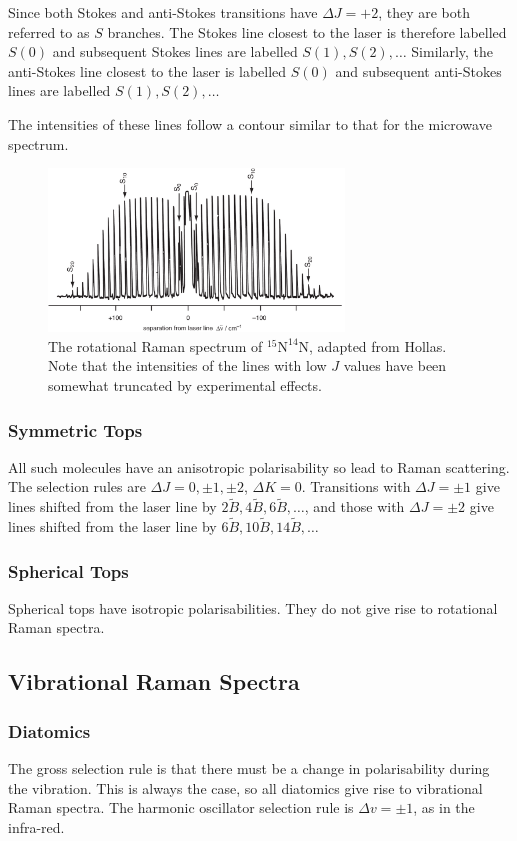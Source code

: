 \documentclass{article}
\theoremstyle{plain}\theoremheaderfont{\normalfont\itshape}\theorembodyfont{\rmfamily}\theoremseparator{.}\newtheorem*{rem}{Remark}\newtheorem*{ex}{Example}\newtheorem*{proof}{Proof}\newtheorem*{altp}{Alternative proof}
\theoremstyle{plain}\theoremheaderfont{\normalfont\bfseries}\theorembodyfont{\rmfamily}\theoremseparator{.}\newtheorem{thm}{Theorem}[section]\newtheorem{lem}[thm]{Lemma}\newtheorem{prop}[thm]{Proposition}\newtheorem*{cor}{Corollary}\newtheorem{defn}[thm]{Definition}\newtheorem{clm}[thm]{Claim}\newtheorem{clminproof}{Claim}\newtheorem{pos}{Postulate}[section]
\theoremstyle{break}\theoremheaderfont{\normalfont\itshape}\theorembodyfont{\rmfamily}\theoremseparator{.\medskip}\newtheorem*{proofskip}{Proof}\newtheorem*{exs}{Examples}\newtheorem*{rems}{Remarks}
\theoremstyle{break}\theoremheaderfont{\normalfont\bfseries}\theorembodyfont{\rmfamily}\theoremseparator{.\medskip}\newtheorem{lemskip}[thm]{Lemma}\newtheorem{defnskip}[thm]{Definition}\newtheorem{propskip}[thm]{Proposition}\newtheorem{thmskip}[thm]{Theorem}
\numberwithin{equation}{section}
\begin{document}
    Since both Stokes and anti-Stokes transitions have \(\Delta J=+2\), they are both referred to as \(S\) branches. The Stokes line closest to the laser is therefore labelled \(S(0)\) and subsequent Stokes lines are labelled \(S(1),S(2),\dots\) Similarly, the anti-Stokes line closest to the laser is
    labelled \(S(0)\) and subsequent anti-Stokes lines are labelled \(S(1),S(2),\dots\)

    The intensities of these lines follow a contour similar to that for the microwave spectrum.
    \begin{figure}
        \centering
        \includegraphics[width=0.7\textwidth]{rot_raman.png}
        \caption{The rotational Raman spectrum of \(\mathrm{^{15}N^{14}N}\), adapted from Hollas. Note that the intensities of the lines with low \(J\) values have been somewhat truncated by experimental effects.}
    \end{figure}
    \subsubsection{Symmetric Tops}
    All such molecules have an anisotropic polarisability so lead to Raman scattering. The selection rules are \(\Delta J=0,\pm 1,\pm 2\), \(\Delta K=0\). Transitions with \(\Delta J=\pm 1\) give lines shifted from the laser line by \(2\tilde{B},4\tilde{B},6\tilde{B},\dots\), and those with \(\Delta J=\pm 2\) give lines shifted from the laser line by \(6\tilde{B},10\tilde{B},14\tilde{B},\dots\)
    \subsubsection{Spherical Tops}
    Spherical tops have isotropic polarisabilities. They do not give rise to rotational Raman spectra.

    \subsection{Vibrational Raman Spectra}
    \subsubsection{Diatomics}
    The gross selection rule is that there must be a change in polarisability during the vibration. This is always the case, so all diatomics give rise to vibrational Raman spectra. The harmonic oscillator selection rule is \(\Delta v=\pm 1\), as in the infra-red.
\end{document}
